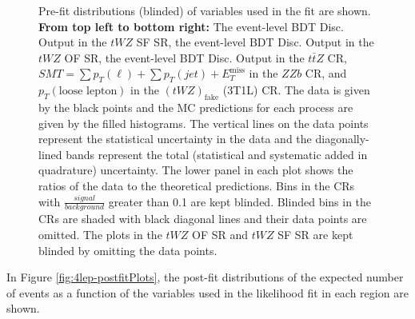 \begin{figure}[htbp]
        \caption{Pre-fit distributions (blinded) of variables used in the fit are shown. \textbf{From top left to bottom right:} The event-level BDT Disc. Output in the $tWZ$ SF SR, the event-level BDT Disc. Output in the $tWZ$ OF SR, the event-level BDT Disc. Output in the $t\bar{t}Z$ CR, $SMT = \sum p_{T} (\ell) + \sum p_{T} (jet) + E_{T}^{\text{miss}}$ in the $ZZb$ CR, and $p_{T}(\text{loose lepton})$ in the $(tWZ)_{\text{fake}}$ (3T1L) CR. The data is given by the black points and the MC predictions for each process are given by the filled histograms. The vertical lines on the data points represent the statistical uncertainty in the data and the diagonally-lined bands represent the total (statistical and systematic added in quadrature) uncertainty. The lower panel in each plot shows the ratios of the data to the theoretical predictions. Bins in the CRs with $\frac{signal}{background}$ greater than 0.1 are kept blinded. Blinded bins in the CRs are shaded with black diagonal lines and their data points are omitted. The plots in the $tWZ$ OF SR and $tWZ$ SF SR are kept blinded by omitting the data points.}
  \label{fig:4lep-prefitPlots}
\end{figure}In Figure \ref{fig:4lep-postfitPlots}, the post-fit distributions of the expected number of events as a function of the variables used in the likelihood fit in each region are shown.
